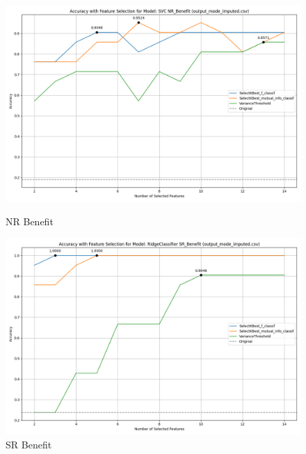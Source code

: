 \begin{figure}[H]
    \centering
    \begin{minipage}[b]{0.45\textwidth}
        \includegraphics[width=\textwidth]{class_specific_section/images_class_ensemble_reduction/feature_selection_accuracy_plot_output_mode_imputedcsv_SVC_NR_Benefit.png}
        \caption{NR Benefit}
        \label{fig_class_spec:nr_ben_featred_graph}
    \end{minipage}
    \hfill
    \begin{minipage}[b]{0.45\textwidth}
        \includegraphics[width=\textwidth]{class_specific_section/images_class_ensemble_reduction/feature_selection_accuracy_plot_output_mode_imputedcsv_RidgeClassifier_SR_Benefit.png}
        \caption{SR Benefit}
        \label{fig_class_spec:sr_ben_featred_graph}
    \end{minipage}
\end{figure}

